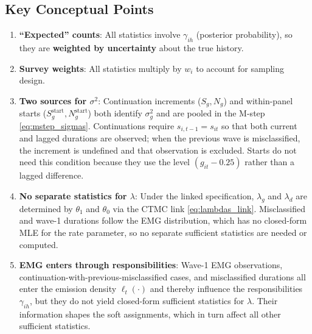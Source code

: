 \documentclass[12pt]{article}
\begin{document}
\newpage
\subsection{Key Conceptual Points}

\begin{enumerate}
\item \textbf{``Expected'' counts}: All statistics involve $\gamma_{ih}$ (posterior probability), so they are \textbf{weighted by uncertainty} about the true history.

\item \textbf{Survey weights}: All statistics multiply by $w_i$ to account for sampling design.

\item \textbf{Two sources for $\sigma^2$}: Continuation increments ($S_g, N_g$) and within-panel starts ($S_g^{\mathrm{start}}, N_g^{\mathrm{start}}$) both identify $\sigma_g^2$ and are pooled in the M-step \eqref{eq:mstep_sigmas}. Continuations require $s_{i,t-1}=s_{it}$ so that both current and lagged durations are observed; when the previous wave is misclassified, the increment is undefined and that observation is excluded. Starts do not need this condition because they use the level $(g_{it}-0.25)$ rather than a lagged difference.

\item \textbf{No separate statistics for $\lambda$}: Under the linked specification, $\lambda_g$ and $\lambda_d$ are determined by $\theta_1$ and $\theta_0$ via the CTMC link \eqref{eq:lambdas_link}. Misclassified and wave-1 durations follow the EMG distribution, which has no closed-form MLE for the rate parameter, so no separate sufficient statistics are needed or computed.

\item \textbf{EMG enters through responsibilities}: Wave-1 EMG observations, continuation-with-previous-misclassified cases, and misclassified durations all enter the emission density $\ell_t(\cdot)$ and thereby influence the responsibilities $\gamma_{ih}$, but they do not yield closed-form sufficient statistics for $\lambda$. Their information shapes the soft assignments, which in turn affect all other sufficient statistics.
\end{enumerate}
\end{document}
